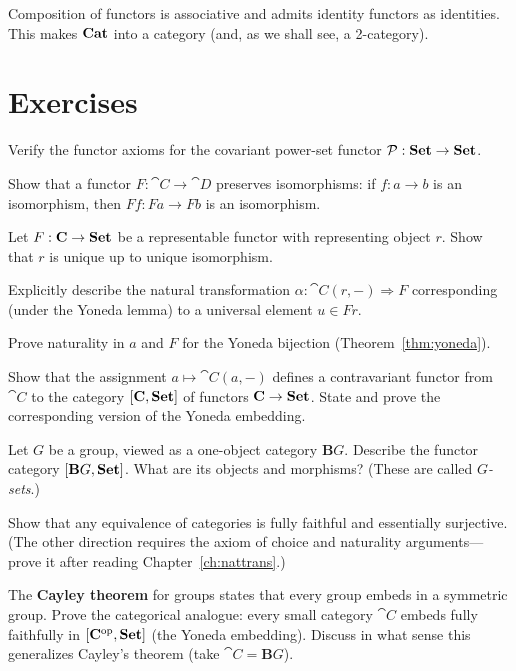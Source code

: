 Composition of functors is associative and admits identity functors as identities. This makes $\mathbf{Cat}$ into a category (and, as we shall see, a 2-category).

\section{Exercises}

\begin{exercise}
Verify the functor axioms for the covariant power-set functor $\mathcal{P}: \mathbf{Set} \to \mathbf{Set}$.
\end{exercise}

\begin{exercise}
Show that a functor $F: \cat{C} \to \cat{D}$ preserves isomorphisms: if $f: a \to b$ is an isomorphism, then $Ff: Fa \to Fb$ is an isomorphism.
\end{exercise}

\begin{exercise}
Let $F: \mathbf{C} \to \mathbf{Set}$ be a representable functor with representing object $r$. Show that $r$ is unique up to unique isomorphism.
\end{exercise}

\begin{exercise}
Explicitly describe the natural transformation $\alpha: \cat{C}(r,-) \Rightarrow F$ corresponding (under the Yoneda lemma) to a universal element $u \in Fr$.
\end{exercise}

\begin{exercise}
Prove naturality in $a$ and $F$ for the Yoneda bijection (Theorem~\ref{thm:yoneda}).
\end{exercise}

\begin{exercise}
Show that the assignment $a \mapsto \cat{C}(a,-)$ defines a contravariant functor from $\cat{C}$ to the category $[\mathbf{C},\mathbf{Set}]$ of functors $\mathbf{C} \to \mathbf{Set}$. State and prove the corresponding version of the Yoneda embedding.
\end{exercise}

\begin{exercise}[$\star$]
Let $G$ be a group, viewed as a one-object category $\mathbf{B}G$. Describe the functor category $[\mathbf{B}G, \mathbf{Set}]$. What are its objects and morphisms? (These are called \emph{$G$-sets}.)
\end{exercise}

\begin{exercise}[$\star$]
Show that any equivalence of categories is fully faithful and essentially surjective. (The other direction requires the axiom of choice and naturality arguments—prove it after reading Chapter~\ref{ch:nattrans}.)
\end{exercise}

\begin{exercise}[$\star\star$]
The \textbf{Cayley theorem} for groups states that every group embeds in a symmetric group. Prove the categorical analogue: every small category $\cat{C}$ embeds fully faithfully in $[\mathbf{C}^{\mathrm{op}}, \mathbf{Set}]$ (the Yoneda embedding). Discuss in what sense this generalizes Cayley's theorem (take $\cat{C} = \mathbf{B}G$).
\end{exercise}
